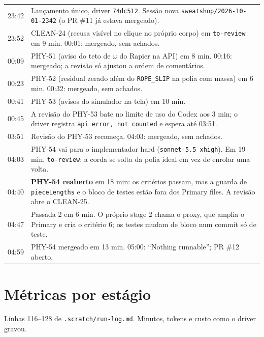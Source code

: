 \documentclass[11pt,a4paper]{article}
\begin{document}
\begin{tabularx}{\linewidth}{@{}lX@{}}
\toprule
23:42 & Lançamento único, driver \texttt{74dc512}. Sessão nova
        \texttt{sweatshop/2026-10-01-2342} (o PR \#11 já estava mergeado).\\
23:52 & CLEAN-24 (recusa visível no clique no próprio corpo) em
        \texttt{to-review} em 9 min. 00:01: mergeado, sem achados.\\
00:09 & PHY-51 (aviso do teto de $\omega$ do Rapier na API) em 8 min. 00:16:
        mergeado; a revisão só ajustou a ordem de comentários.\\
00:23 & PHY-52 (residual zerado além do \texttt{ROPE\_SLIP} na polia com
        massa) em 6 min. 00:32: mergeado, sem achados.\\
00:41 & PHY-53 (avisos do simulador na tela) em 10 min.\\
00:45 & A revisão do PHY-53 bate no limite de uso do Codex aos 3 min; o
        driver registra \texttt{api error, not counted} e espera até 03:51.\\
03:51 & Revisão do PHY-53 recomeça. 04:03: mergeado, sem achados.\\
04:03 & PHY-54 vai para o implementador hard (\texttt{sonnet-5.5 xhigh}). Em
        19 min, \texttt{to-review}: a corda se solta da polia ideal em vez de
        enrolar uma volta.\\
04:40 & \textbf{PHY-54 reaberto} em 18 min: os critérios passam, mas a guarda
        de \texttt{pieceLengths} e o bloco de testes estão fora dos Primary
        files. A revisão abre o CLEAN-25.\\
04:47 & Passada 2 em 6 min. O próprio stage 2 chama o proxy, que amplia o
        Primary e cria o critério 6; os testes mudam de bloco num commit só de
        teste.\\
04:59 & PHY-54 mergeado em 13 min. 05:00: ``Nothing runnable''; PR \#12
        aberto.\\
\bottomrule
\end{tabularx}

\section{Métricas por estágio}

Linhas 116--128 de \texttt{.scratch/run-log.md}. Minutos, tokens e custo como o
driver gravou.
\end{document}
